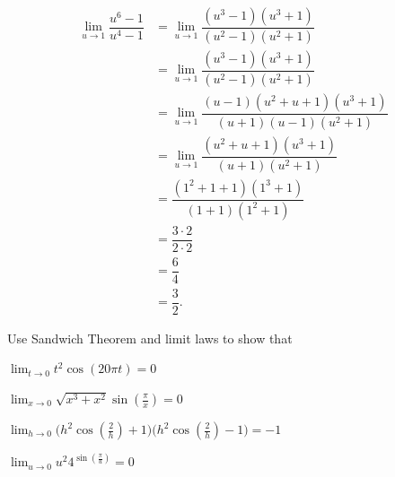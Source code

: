 \documentclass{hwset}
\begin{document}
	\item \begin{solution}
		\begin{align*}
			\lim_{u\to 1}\dfrac{u^{6}-1}{u^{4}-1}
				&= \lim_{u\to 1}\dfrac{(u^{3}-1)(u^{3}+1)}{(u^{2}-1)(u^2+1)} \\
			&= \lim_{u\to 1}\dfrac{(u^{3}-1)(u^{3}+1)}{(u^{2}-1)(u^2+1)} \\
			&= \lim_{u\to 1}\dfrac{(u-1)(u^{2}+u+1)(u^{3}+1)}{(u+1)(u-1)(u^2+1)} \\
			&= \lim_{u\to 1}\dfrac{(u^{2}+u+1)(u^{3}+1)}{(u+1)(u^2+1)} \\
			&= \dfrac{(1^{2}+1+1)(1^{3}+1)}{(1+1)(1^2+1)} \\
			&= \dfrac{3\cdot 2}{2 \cdot 2} \\
			&= \dfrac{6}{4} \\
			&= \boxed{\dfrac{3}{2}.}
		\end{align*}
	\end{solution}
\ee

\begin{problem}[4.] Use Sandwich Theorem and limit laws to show that
	\be
		\item $\lim_{t\to 0}t^{2}\cos(20\pi t)=0$
		\item $\lim_{x\to 0}\sqrt{x^{3}+x^{2}}\sin({\frac{\pi}{x}})=0$
		\item $\lim_{h\to 0}\Big(h^{2}\cos(\frac{2}{h})+1\Big)\Big(h^{2}\cos(\frac{2}{h})-1\Big)=-1$
		\item $\lim_{u\to 0}u^{2}4^{\sin(\frac{\pi}{u})}=0$
	\ee
\end{problem}
\end{document}
